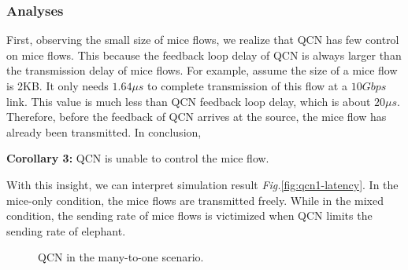 \documentclass[]{sig-alternate-10pt}
\begin{document}
\subsubsection{Analyses}
First, observing the small size of mice flows, we realize that QCN has few control on mice flows.
This because the feedback loop delay of QCN is always larger than the transmission delay of mice flows.
For example, assume the size of a mice flow is 2KB. It only needs $1.64\mu s$ to complete transmission of this flow at a $10Gbps$ link. This value is much less than QCN feedback loop delay, which is about $20\mu s$\cite{benson2010network}. 
Therefore, before the feedback of QCN arrives at the source, the mice flow has already been transmitted.
In conclusion, 

\noindent\textbf{Corollary 3:}
QCN is unable to control the mice flow.

With this insight, we can interpret simulation result \emph{Fig.}\ref{fig:qcn1-latency}. In the mice-only condition, the mice flows are transmitted freely. 
While in the mixed condition, the sending rate of mice flows is victimized when QCN limits the sending rate of elephant.

\begin{figure}[t]
	\centering
	\hfill
	\caption{QCN in the many-to-one scenario.}
	\label{fig:qcn1}
\end{figure}

\iffalse
\begin{figure}[t]
	\centering
	\caption{Mice flows lead to more intense rate decrease and lower throughput for elephant flows.}
	\label{qcn1-analysis}
\end{figure}
\fi
\end{document}
